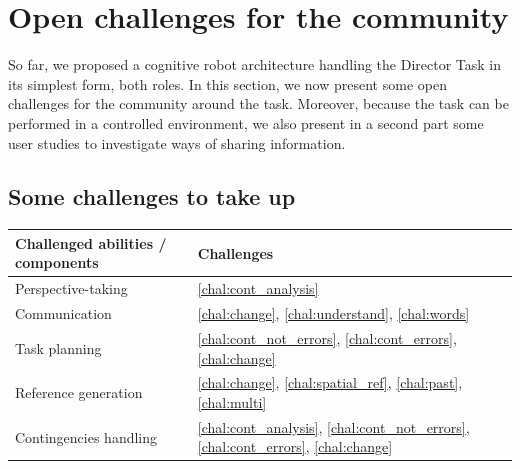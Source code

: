 \documentclass[a4paper,11pt,twoside]{StyleThese}
\begin{document}
\section{Open challenges for the community }
\label{sec:challenges}

So far, we proposed a cognitive robot architecture handling the Director Task in its simplest form, both 
roles. In this section, we now present some open challenges for the community around the task. Moreover, because the task can be performed in a controlled environment, we also present in a second part some user studies to investigate ways of sharing information.

\subsection{Some challenges to take up}

\begin{center}
	\begin{tabular}{||l | l ||} 
		\hline
		Challenged abilities / components & Challenges \\ [0.5ex]
		\hline\hline
		Perspective-taking & \ref{chal:cont_analysis}  \\ 
		\hline
		Communication & \ref{chal:change}, \ref{chal:understand}, \ref{chal:words}\\
		\hline
		Task planning & \ref{chal:cont_not_errors}, \ref{chal:cont_errors},  \ref{chal:change} \\
		\hline
		Reference generation & \ref{chal:change}, \ref{chal:spatial_ref}, \ref{chal:past}, \ref{chal:multi} \\
		\hline
		Contingencies handling & \ref{chal:cont_analysis}, \ref{chal:cont_not_errors}, \ref{chal:cont_errors}, \ref{chal:change} \\ [1ex]
		\hline
	\end{tabular}
\end{center}
\end{document}
